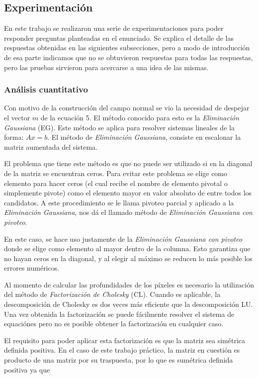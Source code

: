 \subsection{Experimentación}

En este trabajo se realizaron una serie de experimentaciones para poder responder preguntas planteadas en el enunciado. Se explica el detalle de las respuestas obtenidas en las siguientes subsecciones, pero a modo de introducción de esa parte indicamos que no se obtuvieron respuestas para todas las respuestas, pero las pruebas sirvieron para acercarse a una idea de las mismas.

\subsubsection{Análisis cuantitativo}

Con motivo de la construcción del campo normal se vio la necesidad de despejar el vector $m$ de la ecuación 5. El método conocido para esto es la \textit{Eliminación Gaussiana} (EG). Este método se aplica para resolver sistemas lineales de la forma: $Ax = b$. El método de \textit{Eliminación Gaussiana}, consiste en escalonar la matriz aumentada del sistema.

El problema que tiene este método es que no puede ser utilizado si en la diagonal de la matriz se encuentran ceros. Para evitar este problema se elige como elemento para hacer ceros (el cual recibe el nombre de elemento pivotal o simplemente pivote) como el elemento mayor en valor absoluto de entre todos los candidatos. A este procedimiento se le llama pivoteo parcial y aplicado a la \textit{Eliminación Gaussiana}, nos dá el llamado método de \textit{Eliminación Gaussiana con pivoteo}.

En este caso, se hace uso justamente de la \textit{Eliminación Gaussiana con pivoteo} donde se elige como elemento al mayor dentro de la columna. Esto garantiza que no hayan ceros en la diagonal, y al elegir al máximo se reducen lo más posible los errores numéricos.

Al momento de calcular las profundidades de los píxeles es necesario la utilización del método de \textit{Factorización de Cholesky} (CL). Cuando es aplicable, la descomposición de Cholesky es dos veces más eficiente que la descomposición LU. Una vez obtenida la factorización se puede fácilmente resolver el sistema de equaciónes pero no es posible obtener la factorización en cualquier caso.

El requisito para poder aplicar esta factorización es que la matriz sea simétrica definida positiva. En el caso de este trabajo práctico, la matriz en cuestión es producto de una matriz por su traspuesta, por lo que es sumétrica definida positiva ya que

